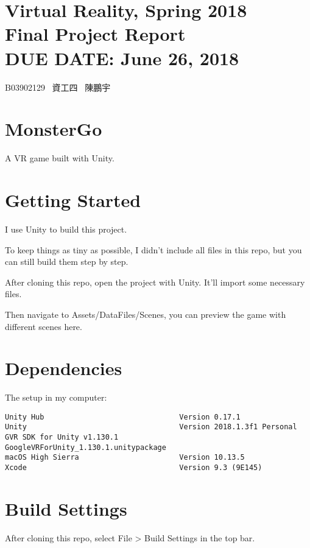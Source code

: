 \documentclass{article}
\newcommand{\hmwkClass}{Virtual Reality, Spring 2018}
\newcommand{\hmwkTitle}{Final Project Report}
\newcommand{\hmwkDueDate}{June 26, 2018}
\begin{document}
\thispagestyle{empty}
\section*{\hmwkClass \\
    \normalsize{\hmwkTitle} \\
    \normalsize{DUE DATE: \hmwkDueDate}
}

\hfill{B03902129 \, 資工四 \, 陳鵬宇} \\

\section*{MonsterGo}

A VR game built with Unity.

\section*{Getting Started}

I use Unity to build this project.

To keep things as tiny as possible, I didn't include all files in this repo, but you can still build them step by step.

After cloning this repo, open the project with Unity. It'll import some necessary files.

Then navigate to Assets/DataFiles/Scenes, you can preview the game with different scenes here.

\section*{Dependencies}

The setup in my computer:

\begin{lstlisting}
Unity Hub                               Version 0.17.1
Unity                                   Version 2018.1.3f1 Personal
GVR SDK for Unity v1.130.1              GoogleVRForUnity_1.130.1.unitypackage
macOS High Sierra                       Version 10.13.5
Xcode                                   Version 9.3 (9E145)
\end{lstlisting}

\section*{Build Settings}

After cloning this repo, select File > Build Settings in the top bar.
\end{document}
